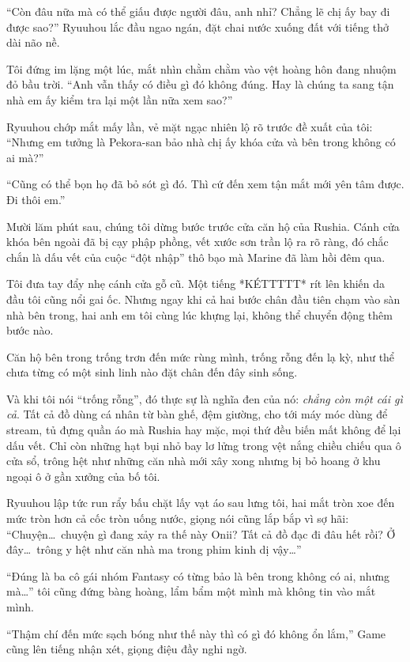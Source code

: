 \documentclass[../main.tex]{subfiles}
\begin{document}
``Còn đâu nữa mà có thể giấu được người đâu, anh nhỉ? Chẳng lẽ chị ấy bay đi được sao?'' Ryuuhou lắc đầu ngao ngán, đặt chai nước xuống đất với tiếng thở dài não nề.

Tôi đứng im lặng một lúc, mắt nhìn chằm chằm vào vệt hoàng hôn đang nhuộm đỏ bầu trời. ``Anh vẫn thấy có điều gì đó không đúng. Hay là chúng ta sang tận nhà em ấy kiểm tra lại một lần nữa xem sao?''

Ryuuhou chớp mắt mấy lần, vẻ mặt ngạc nhiên lộ rõ trước đề xuất của tôi: ``Nhưng em tưởng là Pekora-san bảo nhà chị ấy khóa cửa và bên trong không có ai mà?''

``Cũng có thể bọn họ đã bỏ sót gì đó. Thì cứ đến xem tận mắt mới yên tâm được. Đi thôi em.''

\ct

Mười lăm phút sau, chúng tôi dừng bước trước cửa căn hộ của Rushia. Cánh cửa khóa bên ngoài đã bị cạy phập phồng, vết xước sơn trần lộ ra rõ ràng, đó chắc chắn là dấu vết của cuộc ``đột nhập'' thô bạo mà Marine đã làm hồi đêm qua.

Tôi đưa tay đẩy nhẹ cánh cửa gỗ cũ. Một tiếng *KÉTTTTT* rít lên khiến da đầu tôi cũng nổi gai ốc. Nhưng ngay khi cả hai bước chân đầu tiên chạm vào sàn nhà bên trong, hai anh em tôi cùng lúc khựng lại, không thể chuyển động thêm bước nào.

Căn hộ bên trong trống trơn đến mức rùng mình, trống rỗng đến lạ kỳ, như thể chưa từng có một sinh linh nào đặt chân đến đây sinh sống.

Và khi tôi nói ``trống rỗng'', đó thực sự là nghĩa đen của nó: \emph{chẳng còn một cái gì cả}. Tất cả đồ dùng cá nhân từ bàn ghế, đệm giường, cho tới máy móc dùng để stream, tủ đựng quần áo mà Rushia hay mặc, mọi thứ đều biến mất không để lại dấu vết. Chỉ còn những hạt bụi nhỏ bay lơ lửng trong vệt nắng chiều chiếu qua ô cửa sổ, trông hệt như những căn nhà mới xây xong nhưng bị bỏ hoang ở khu ngoại ô ở gần xưởng của bố tôi.

Ryuuhou lập tức run rẩy bấu chặt lấy vạt áo sau lưng tôi, hai mắt tròn xoe đến mức tròn hơn cả cốc tròn uống nước, giọng nói cũng lắp bắp vì sợ hãi: ``Chuyện\dots\ chuyện gì đang xảy ra thế này Onii? Tất cả đồ đạc đi đâu hết rồi? Ở đây\dots\ trông y hệt như căn nhà ma trong phim kinh dị vậy\dots''

``Đúng là ba cô gái nhóm Fantasy có từng bảo là bên trong không có ai, nhưng mà\dots'' tôi cũng đứng bàng hoàng, lẩm bẩm một mình mà không tin vào mắt mình.

``Thậm chí đến mức sạch bóng như thế này thì có gì đó không ổn lắm,'' Game cũng lên tiếng nhận xét, giọng điệu đầy nghi ngờ.
\end{document}
